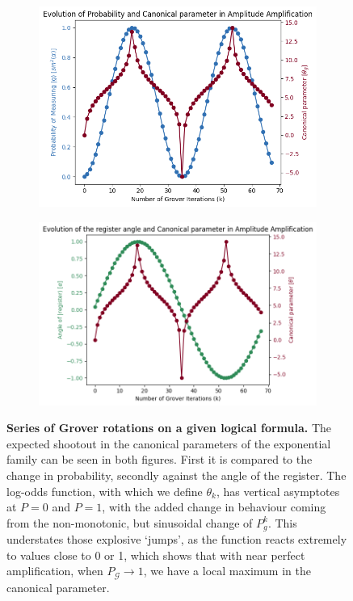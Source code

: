 \documentclass[encoding=utf8,british]{tumphthesis}
\begin{document}
            \begin{figure}[H]
            \centering

            \begin{subfigure}{0.65\textwidth}
            \includegraphics[width=\linewidth]{pics/can_prob.png}
            \label{subfig:can_PROB}
            \end{subfigure}

            \medskip %
            \begin{subfigure}{0.75\textwidth}
            \includegraphics[width=\linewidth]{pics/can_angle.png}
            \label{subfig:can_ANG}
            \end{subfigure}

            \caption{\textbf{Series of Grover rotations on a given logical formula.} The expected shootout in the canonical parameters of the exponential family
            can be seen in both figures. First it is compared to the change in probability, secondly against the angle of the register. The log-odds function, with which we define $\theta_k$, has vertical asymptotes at $P = 0$ and $P = 1$, with the added 
            change in behaviour coming from the non-monotonic, but sinusoidal change of $P_g^k$. This understates those explosive `jumps', as the function reacts 
            extremely to values close to 0 or 1, which shows that with near perfect amplification, when $P_{\mathcal{G}} \rightarrow 1$, we have a local maximum 
            in the canonical parameter.}
            \label{fig:can_changes}


\end{figure}
\end{document}
